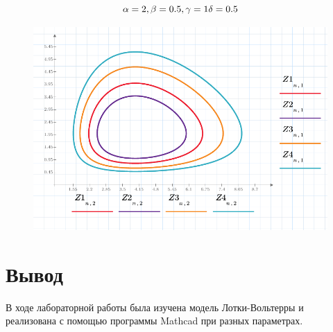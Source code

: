 \documentclass[a4paper, 14pt]{extarticle}
\begin{document}
		\noindent\[
		\alpha = 2,\\
		\beta = 0.5,\\
		\gamma = 1\\
		\delta = 0.5
		\]
		\begin{figure}[H]
			\centering
			\includegraphics[width = \linewidth]{6.pdf}
			\caption[.] {}
		\end{figure}
	
	\section{Вывод}
		В ходе лабораторной работы была изучена модель Лотки-Вольтерры и реализована с помощью программы
		Mathcad при разных параметрах. 
		
\end{document}
